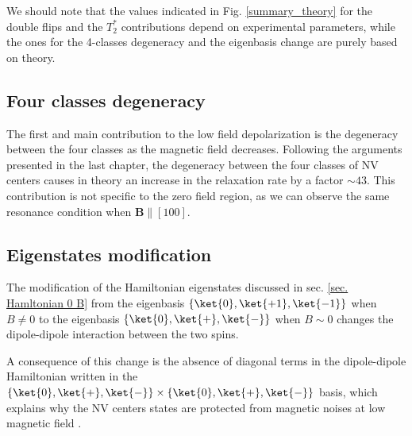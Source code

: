 \documentclass[a4paper,11pt]{report}
\begin{document}
We should note that the values indicated in Fig. \ref{summary_theory} for the double flips and the $T_2^*$ contributions depend on experimental parameters, while the ones for the 4-classes degeneracy and the eigenbasis change are purely based on theory.

\subsection{Four classes degeneracy}

The first and main contribution to the low field depolarization is the degeneracy between the four classes as the magnetic field decreases. Following the arguments presented in the last chapter, the degeneracy between the four classes of NV centers causes in theory an increase in the relaxation rate by a factor $\sim 43$. This contribution is not specific to the zero field region, as we can observe the same resonance condition when $\mathbf{B} \parallel [100]$.


\subsection{Eigenstates modification}

The modification of the Hamiltonian eigenstates discussed in sec. \ref{sec. Hamltonian 0 B} from the eigenbasis $\{ \ket{0}, \ket{+1},\ket{-1} \}$ when $B\neq 0$ to the eigenbasis $\{ \ket{0}, \ket{+},\ket{-} \}$ when $B\sim 0$ changes the dipole-dipole interaction between the two spins. 

A consequence of this change is the absence of diagonal terms  in the dipole-dipole Hamiltonian written in the $\{ \ket{0}, \ket{+},\ket{-} \} \times \{ \ket{0}, \ket{+},\ket{-} \}$ basis, which explains why the NV centers states are protected from magnetic noises at low magnetic field \citep{jamonneau2016competition}. 
\end{document}
